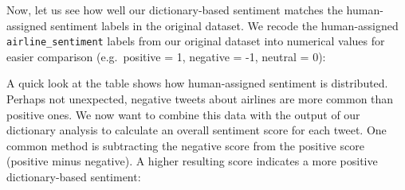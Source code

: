 \documentclass[
]{book}
\newenvironment{Shaded}{\begin{snugshade}}{\end{snugshade}}
\newcommand{\CommentTok}[1]{\textcolor[rgb]{0.56,0.35,0.01}{\textit{#1}}}
\newcommand{\FunctionTok}[1]{\textcolor[rgb]{0.13,0.29,0.53}{\textbf{#1}}}
\newcommand{\NormalTok}[1]{#1}
\newcommand{\OtherTok}[1]{\textcolor[rgb]{0.56,0.35,0.01}{#1}}
\newcommand{\SpecialCharTok}[1]{\textcolor[rgb]{0.81,0.36,0.00}{\textbf{#1}}}
\newcommand{\StringTok}[1]{\textcolor[rgb]{0.31,0.60,0.02}{#1}}
\begin{document}
Now, let us see how well our dictionary-based sentiment matches the human-assigned sentiment labels in the original dataset. We recode the human-assigned \texttt{airline\_sentiment} labels from our original dataset into numerical values for easier comparison (e.g.~positive = 1, negative = -1, neutral = 0):

\begin{Shaded}
\end{Shaded}

A quick look at the table shows how human-assigned sentiment is distributed. Perhaps not unexpected, negative tweets about airlines are more common than positive ones. We now want to combine this data with the output of our dictionary analysis to calculate an overall sentiment score for each tweet. One common method is subtracting the negative score from the positive score (positive minus negative). A higher resulting score indicates a more positive dictionary-based sentiment:

\begin{Shaded}
\end{Shaded}
\end{document}
